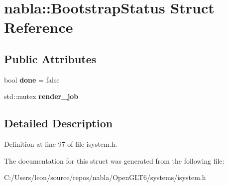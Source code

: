 \hypertarget{structnabla_1_1_bootstrap_status}{}\section{nabla\+::Bootstrap\+Status Struct Reference}
\label{structnabla_1_1_bootstrap_status}
\subsection*{Public Attributes}
\begin{DoxyCompactItemize}
\item 
\mbox{\label{structnabla_1_1_bootstrap_status_ad9f9116214e6bf419e4b39cbdf749030}} 
bool {\bfseries done} = false
\item 
\mbox{\label{structnabla_1_1_bootstrap_status_a4a27572495884a9504e99d4319361736}} 
std\+::mutex {\bfseries render\+\_\+job}
\end{DoxyCompactItemize}


\subsection{Detailed Description}


Definition at line 97 of file isystem.\+h.



The documentation for this struct was generated from the following file\+:\begin{DoxyCompactItemize}
\item 
C\+:/\+Users/leon/source/repos/nabla/\+Open\+G\+L\+T6/systems/isystem.\+h\end{DoxyCompactItemize}

